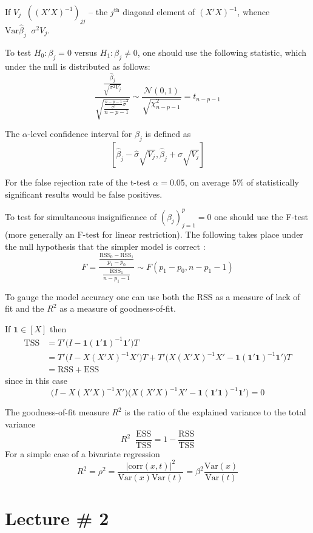 \documentclass[a4paper]{article}
\newcommand{\clo}[1]{{\left [ #1 \right ]}}
\newcommand{\brac}[1]{{\left ( #1 \right )}}
\newcommand{\abs}[1]{{\left | #1 \right |}}
\newcommand{\Ncal}{\mathcal{N}}
\newcommand{\Var}[0]{{\text{Var}}}
\newcommand{\RSS}{\text{RSS}}
\newcommand{\one}{\mathbf{1}}
\newcommand{\defn}{\mathop{\overset{\Delta}{=}}\nolimits}
\begin{document}
If $V_j \defn \brac{\brac{X'X}^{-1}}_{jj}$ -- the $j^\text{th}$ diagonal element
of $\brac{X'X}^{-1}$, whence $\Var\hat{\beta}_j\defn \sigma^2 V_j$.

To test $H_0:\beta_j=0$ versus $H_1:\beta_j\neq 0$, one should use the following
statistic, which under the null is distributed as follows:
\[\frac{\frac{\hat{\beta}_j}{\sqrt{\sigma^2 V_j}}}{\sqrt{ \frac{\frac{n-p-1}{\sigma^2} \hat{\sigma}^2 }{ n-p-1 } }} \sim \frac{\Ncal(0, 1)}{\sqrt{\chi^2_{n-p-1}}} = t_{n-p-1}\]

The $\alpha$-level confidence interval for $\beta_j$ is defined as
\[\clo{ \hat{\beta}_j - \hat{\sigma} \sqrt{ V_j },  \hat{\beta}_j + \hat{\sigma} \sqrt{ V_j } }\]

For the false rejection rate of the t-test $\alpha = 0.05$, on average $5\%$ of
statistically significant results would be false positives.

To test for simultaneous insignificance of $\brac{\beta_j}_{j=1}^p = 0$ one should
use the F-test (more generally an F-test for linear restriction). The following
takes place under the null hypothesis that the simpler model is correct :
\[F = \frac{\frac{\RSS_0-\RSS_1}{p_1-p_0}}{\frac{\RSS_1}{n-p_1-1}}\sim F(p_1-p_0, n-p_1-1)\]

To gauge the model accuracy one can use both the RSS as a measure of lack of fit
and the $R^2$ as a measure of goodness-of-fit.

If $\one\in \clo{X}$ then
\begin{align*}
	\text{TSS} &= T' \bigr(I - \one(\one'\one)^{-1}\one'\bigl) T \\
	&= T' \bigl(I - X(X'X)^{-1}X'\bigr) T + T' \bigl( X(X'X)^{-1}X' - \one(\one'\one)^{-1}\one'\bigr) T \\
	&= \RSS + \text{ESS}
\end{align*}
since in this case
\[\bigl(I - X(X'X)^{-1}X'\bigr)\bigl( X(X'X)^{-1}X' - \one(\one'\one)^{-1}\one'\bigr) = 0\]

The goodness-of-fit measure $R^2$ is the ratio of the explained variance to the
total variance
\[R^2 \defn \frac{\text{ESS}}{\text{TSS}} = 1 - \frac{\RSS}{\text{TSS}} \]
For a simple case of a bivariate regression
\[R^2 = \rho^2 = \frac{\abs{\text{corr}(x,t)}^2}{\Var(x)\Var(t)} = \beta^2 \frac{\Var(x)}{\Var(t)}\]




\clearpage
\section{Lecture \# 2} %
\label{sec:lecture_2}
\end{document}
